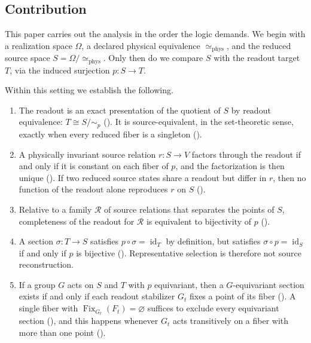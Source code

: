\documentclass[11pt,reqno]{amsart}
\theoremstyle{plain}
\theoremstyle{definition}
\theoremstyle{remark}
\DeclareMathOperator{\Fix}{Fix}
\DeclareMathOperator{\id}{id}
\newcommand{\phe}{\simeq_{\mathrm{phys}}}
\newcommand{\Om}{\Omega}
\begin{document}
\subsection*{Contribution}

This paper carries out the analysis in the order the logic demands. We begin with a realization space $\Om$, a declared physical equivalence $\phe$, and the reduced source space $S=\Om/\!\phe$. Only then do we compare $S$ with the readout target $T$, via the induced surjection $p\colon S\to T$.

Within this setting we establish the following.

\begin{enumerate}
\item The readout is an exact presentation of the quotient of $S$ by readout equivalence: $T\cong S/\!\sim_{p}$ (). It is source-equivalent, in the set-theoretic sense, exactly when every reduced fiber is a singleton ().

\item A physically invariant source relation $r\colon S\to V$ factors through the readout if and only if it is constant on each fiber of $p$, and the factorization is then unique (). If two reduced source states share a readout but differ in $r$, then no function of the readout alone reproduces $r$ on $S$ ().

\item Relative to a family $\mathcal{R}$ of source relations that separates the points of $S$, completeness of the readout for $\mathcal{R}$ is equivalent to bijectivity of $p$ ().

\item A section $\sigma\colon T\to S$ satisfies $p\circ\sigma=\id_{T}$ by definition, but satisfies $\sigma\circ p=\id_{S}$ if and only if $p$ is bijective (). Representative selection is therefore not source reconstruction.

\item If a group $G$ acts on $S$ and $T$ with $p$ equivariant, then a $G$-equivariant section exists if and only if each readout stabilizer $G_{t}$ fixes a point of its fiber (). A single fiber with $\Fix_{G_{t}}(F_{t})=\varnothing$ suffices to exclude every equivariant section (), and this happens whenever $G_{t}$ acts transitively on a fiber with more than one point ().


\end{enumerate}
\end{document}
